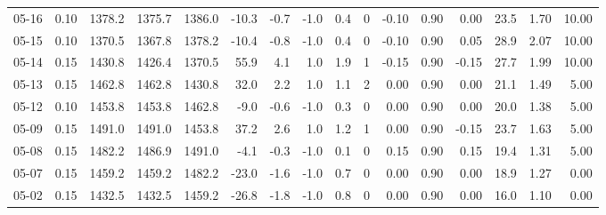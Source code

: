 \begin{threeparttable}
{\begin{tabular}{lrrrrrrrrrrrrrrr}
  05-16 &     0.10 & 1378.2 & 1375.7 & 1386.0 &      -10.3 &           -0.7 &                     -1.0 &                 0.4 &              0 &      -0.10 &      0.90 &           0.00 &             23.5 &            1.70 &                  10.00 \\
  05-15 &     0.10 & 1370.5 & 1367.8 & 1378.2 &      -10.4 &           -0.8 &                     -1.0 &                 0.4 &              0 &      -0.10 &      0.90 &           0.05 &             28.9 &            2.07 &                  10.00 \\
  05-14 &     0.15 & 1430.8 & 1426.4 & 1370.5 &       55.9 &            4.1 &                      1.0 &                 1.9 &              1 &      -0.15 &      0.90 &          -0.15 &             27.7 &            1.99 &                  10.00 \\
  05-13 &     0.15 & 1462.8 & 1462.8 & 1430.8 &       32.0 &            2.2 &                      1.0 &                 1.1 &              2 &       0.00 &      0.90 &           0.00 &             21.1 &            1.49 &                   5.00 \\
  05-12 &     0.10 & 1453.8 & 1453.8 & 1462.8 &       -9.0 &           -0.6 &                     -1.0 &                 0.3 &              0 &       0.00 &      0.90 &           0.00 &             20.0 &            1.38 &                   5.00 \\
  05-09 &     0.15 & 1491.0 & 1491.0 & 1453.8 &       37.2 &            2.6 &                      1.0 &                 1.2 &              1 &       0.00 &      0.90 &          -0.15 &             23.7 &            1.63 &                   5.00 \\
  05-08 &     0.15 & 1482.2 & 1486.9 & 1491.0 &       -4.1 &           -0.3 &                     -1.0 &                 0.1 &              0 &       0.15 &      0.90 &           0.15 &             19.4 &            1.31 &                   5.00 \\
  05-07 &     0.15 & 1459.2 & 1459.2 & 1482.2 &      -23.0 &           -1.6 &                     -1.0 &                 0.7 &              0 &       0.00 &      0.90 &           0.00 &             18.9 &            1.27 &                   0.00 \\
  05-02 &     0.15 & 1432.5 & 1432.5 & 1459.2 &      -26.8 &           -1.8 &                     -1.0 &                 0.8 &              0 &       0.00 &      0.90 &           0.00 &             16.0 &            1.10 &                   0.00 \\

\end{tabular}}
\end{threeparttable}
